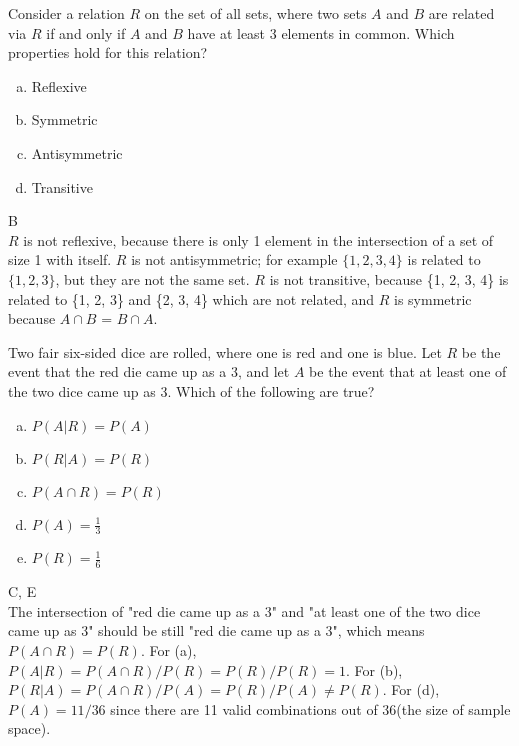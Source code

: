 
Consider a relation $R$ on the set of all sets, where two sets $A$ and $B$ are related via $R$ if and only if $A$ and $B$ have at least 3 elements in common. Which properties hold for this relation?

\begin{enumerate}[(a)]
	\item  Reflexive
    
	\item  Symmetric
    
	\item  Antisymmetric
    
	\item  Transitive

\end{enumerate}
\begin{solution}

B
\\
$R$ is not reflexive, because there is only 1 element in the intersection of a set of size 1 with
itself. $R$ is not antisymmetric; for example $\{1,2,3,4\}$ is related to $\{1,2,3\}$, but they are not the same set. $R$ is not transitive, because \{1, 2, 3, 4\} is related to \{1, 2, 3\} and \{2, 3, 4\} which are
not related, and $R$ is symmetric because $A \cap B$ = $B \cap A$.

\end{solution}


Two fair six-sided dice are rolled, where one is red and one is blue. Let $R$ be the event that the red die came up as a 3, and let $A$ be the event that at least one of the two dice came up as 3. Which of the following are true?

\begin{enumerate} [(a)]
    \item $P(A|R) = P(A)$
    \item $P(R|A) = P(R)$
    \item $P(A \cap R) = P(R)$
    \item $P(A) = \frac{1}{3}$
    \item $P(R) = \frac{1}{6}$
\end{enumerate}

\begin{solution}
C, E
\\
The intersection of "red die came up as a 3" and "at least one of the two dice came up as 3" should be still "red die came up as a 3", which means $P(A \cap R) = P(R)$. For (a), $P(A|R) = P(A \cap R)/P(R) = P(R)/P(R) = 1$. For (b), $P(R|A) = P(A \cap R)/P(A) = P(R)/P(A) \neq P(R)$. For (d), $P(A) = 11/36$ since there are 11 valid combinations out of 36(the size of sample space).
\end{solution}


